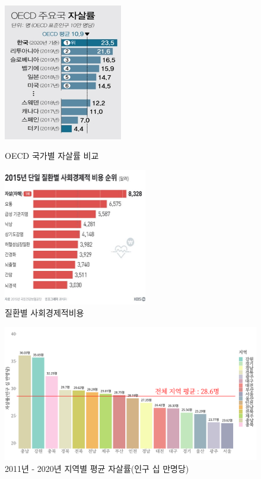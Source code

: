 \documentclass[a4paper, 11pt]{oblivoir}
\begin{document}
    \begin{figure}[h!]
        \includegraphics[height = 6cm, width = \linewidth]{picture2.png}
        \caption{OECD 국가별 자살률 비교}
        \label{fig:pic1}
        \endminipage\hfill
        \includegraphics[height = 6cm, width = \linewidth]{picture1.jpg}
        \caption{질환별 사회경제적비용}
        \label{fig:pic2}
        \endminipage\hfill
    
    \end{figure}
    \begin{figure}[h!]
        \includegraphics[width = 1\textwidth]{picture3.png}
        \caption{2011년 - 2020년 지역별 평균 자살률(인구 십 만명당)}
        \label{fig:pic3}
      \end{figure}
\end{document}
